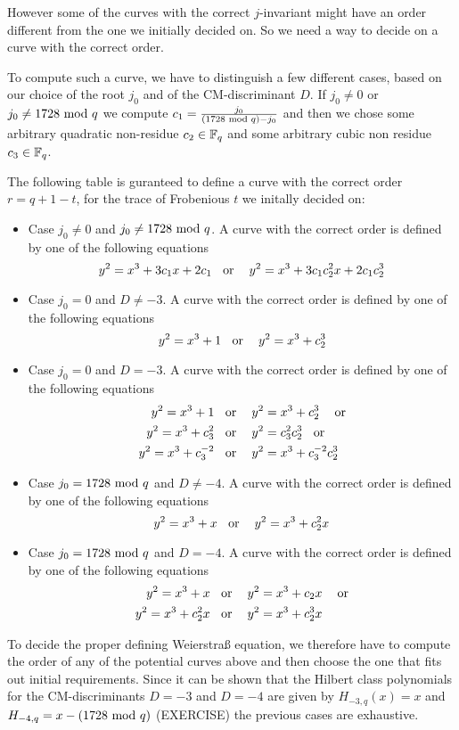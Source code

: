 However some of the curves with the correct $j$-invariant might have an order different from the one we initially decided on. So we need a way to decide on a curve with the correct order. 

To compute such a curve, we have to distinguish a few different cases, based on our choice of the root $j_0$ and of the CM-discriminant $D$. If $j_0\neq 0$ or $j_0\neq 1728 \text{ mod } q$ we compute $c_1=\frac{j_0}{(1728 \text{ mod } q) -j_0}$ and then we chose some arbitrary quadratic non-residue $c_2\in \mathbb{F}_q$ and some arbitrary cubic non residue $c_3\in \mathbb{F}_q$. 

The following table is guranteed to define a curve with the correct order $r= q+1 -t$, for the trace of Frobenious $t$ we initally decided on:
\begin{itemize}
\item Case $j_0 \neq 0 $ and $j_0\neq 1728 \text{ mod } q$. A curve with the correct order is defined by one of the following equations 
\begin{equation}
y^2 = x^3 + 3c_1x + 2c_1 \text{\;\; or \;\; } y^2 = x^3 + 3c_1c_2^2x + 2c_1c_2^3
\end{equation}
\item Case $j_0 = 0 $ and $D\neq -3$. A curve with the correct order is defined by one of the following equations 
\begin{equation}
y^2 = x^3 + 1 \text{\;\; or \;\; } y^2 = x^3 + c_2^3
\end{equation}
\item Case $j_0 = 0 $ and $D= -3$. A curve with the correct order is defined by one of the following equations 
\begin{align*}
y^2 = x^3 +1 & \text{\;\; or \;\; } y^2 = x^3 + c_2^3 \text{ \;\; or}\\  
y^2 = x^3 + c_3^2 & \text{\;\; or \;\; } y^2 = c_3^2 c_2^3 \text{\;\; or}\\
y^2 = x^3 + c_3^{-2} & \text{\;\; or \;\; }  y^2 = x^3 + c_3^{-2}c_2^3 
\end{align*}
\item Case $j_0 = 1728 \text{ mod } q $ and $D\neq -4$. A curve with the correct order is defined by one of the following equations 
\begin{equation}
y^2 = x^3 + x \text{\;\; or \;\; } y^2 = x^3 + c_2^2x
\end{equation}
\item Case $j_0 = 1728 \text{ mod } q $ and $D= -4$. A curve with the correct order is defined by one of the following equations 
\begin{align*}
y^2 = x^3 +x & \text{\;\; or \;\; } y^2 = x^3 + c_2x \text{ \;\; or}\\  
y^2 = x^3 + c_2^2x & \text{\;\; or \;\; } y^2 = x^3 + c_2^3x
\end{align*}
\end{itemize} 
To decide the proper defining Weierstraß equation, we therefore have to compute the order of any of the potential curves above and then choose the one that fits out initial requirements. Since it can be shown that the Hilbert class polynomials for the CM-discriminants $D=-3$ and $D=-4$ are given by  $H_{-3,q}(x)=x$ and $H_{-4,q}= x-(1728 \text{ mod } q)$ (EXERCISE) the previous cases are exhaustive.


